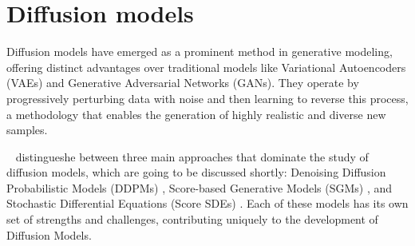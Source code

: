 \section{Diffusion models}\label{diffusion Models}

Diffusion models have emerged as a prominent method in generative modeling, offering distinct advantages over traditional models like Variational Autoencoders (VAEs) and Generative Adversarial Networks (GANs). They operate by progressively perturbing data with noise and then learning to reverse this process, a methodology that enables the generation of highly realistic and diverse new samples.

~\cite{yangdiffusionSummary} distingueshe between three main approaches that dominate the study of diffusion models, which are going to be discussed shortly: Denoising Diffusion Probabilistic Models (DDPMs) \citep{hoDDPMs,sohlDDPM}, Score-based Generative Models (SGMs) \citep{song2019SGM}, and Stochastic Differential Equations (Score SDEs) \citep{song2020score, song2021maximum}. Each of these models has its own set of strengths and challenges, contributing uniquely to the development of Diffusion Models.



